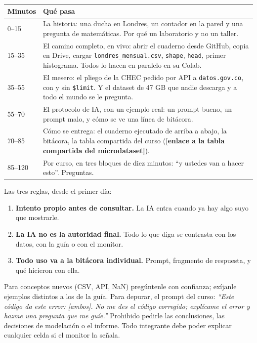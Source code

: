 \documentclass[12pt,letterpaper]{article}
\newcommand{\TABLACURSO}{\textbf{[enlace a la tabla compartida del microdataset]}}
\begin{document}
\begin{center}
\small
\begin{tabularx}{\textwidth}{l X}
\toprule
\textbf{Minutos} & \textbf{Qué pasa}\\
\midrule
0--15 & La historia: una ducha en Londres, un contador en la pared y una pregunta de matemáticas. Por qué un laboratorio y no un taller.\\
15--35 & El camino completo, en vivo: abrir el cuaderno desde GitHub, copia en Drive, cargar \texttt{londres\_mensual.csv}, \texttt{shape}, \texttt{head}, primer histograma. Todos lo hacen en paralelo en su Colab.\\
35--55 & El mesero: el pliego de la CHEC pedido por API a \texttt{datos.gov.co}, con y sin \texttt{\$limit}. Y el dataset de 47 GB que nadie descarga y a todo el mundo se le pregunta.\\
55--70 & El protocolo de IA, con un ejemplo real: un prompt bueno, un prompt malo, y cómo se ve una línea de bitácora.\\
70--85 & Cómo se entrega: el cuaderno ejecutado de arriba a abajo, la bitácora, la tabla compartida del curso (\TABLACURSO).\\
85--120 & Por curso, en tres bloques de diez minutos: ``y ustedes van a hacer esto''. Preguntas.\\
\bottomrule
\end{tabularx}
\end{center}

\begin{cajaia}
Las tres reglas, desde el primer día:
\begin{enumerate}[leftmargin=1.5em]
    \item \textbf{Intento propio antes de consultar.} La IA entra cuando ya hay algo suyo que mostrarle.
    \item \textbf{La IA no es la autoridad final.} Todo lo que diga se contrasta con los datos, con la guía o con el monitor.
    \item \textbf{Todo uso va a la bitácora individual.} Prompt, fragmento de respuesta, y qué hicieron con ella.
\end{enumerate}
Para conceptos nuevos (CSV, API, NaN) pregúntenle con confianza; exíjanle ejemplos distintos a los de la guía. Para depurar, el prompt del curso: \emph{``Este código da este error: [ambos]. No me des el código corregido; explícame el error y hazme una pregunta que me guíe.''} Prohibido pedirle las conclusiones, las decisiones de modelación o el informe. Todo integrante debe poder explicar cualquier celda si el monitor la señala.
\end{cajaia}
\end{document}
